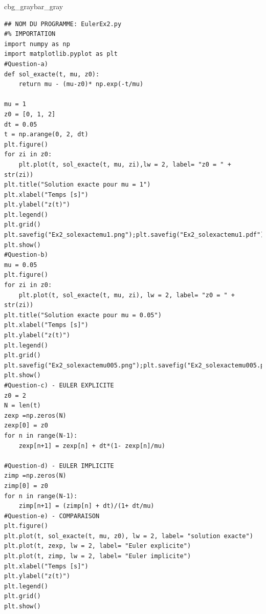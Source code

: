 \documentclass[%
oneside,                 %
final,                   %
10pt,french]{article}
\newenvironment{_pro_tight}[2]{
   \def\FrameCommand{\color{#2}\vrule width 1mm\normalcolor\colorbox{#1}}
   \FrameRule0.6pt\MakeFramed {\advance\hsize-2mm\FrameRestore}\vskip3mm}
   {\vskip0mm\endMakeFramed}
\newenvironment{pro}[2]{
\bgroup\rmfamily
\fboxsep=0mm\relax
\begin{_pro_tight}{#1}{#2}
\list{}{\parsep=-2mm\parskip=0mm\topsep=0pt\leftmargin=2mm
\rightmargin=2\leftmargin\leftmargin=4pt\relax}
\item\relax}
{\endlist\end{_pro_tight}\egroup}
\newenvironment{doconceexercise}{}{}
\begin{document}
\begin{doconceexercise}
\noindent
\begin{pro}{cbg_gray}{bar_gray}\begin{verbatim}
## NOM DU PROGRAMME: EulerEx2.py
#% IMPORTATION
import numpy as np
import matplotlib.pyplot as plt
#Question-a)
def sol_exacte(t, mu, z0):
    return mu - (mu-z0)* np.exp(-t/mu)

mu = 1
z0 = [0, 1, 2]
dt = 0.05
t = np.arange(0, 2, dt)
plt.figure()
for zi in z0:
    plt.plot(t, sol_exacte(t, mu, zi),lw = 2, label= "z0 = " + str(zi))
plt.title("Solution exacte pour mu = 1")
plt.xlabel("Temps [s]")
plt.ylabel("z(t)")
plt.legend()
plt.grid()
plt.savefig("Ex2_solexactemu1.png");plt.savefig("Ex2_solexactemu1.pdf")
plt.show()
#Question-b)
mu = 0.05
plt.figure()
for zi in z0:
    plt.plot(t, sol_exacte(t, mu, zi), lw = 2, label= "z0 = " + str(zi))
plt.title("Solution exacte pour mu = 0.05")
plt.xlabel("Temps [s]")
plt.ylabel("z(t)")
plt.legend()
plt.grid()
plt.savefig("Ex2_solexactemu005.png");plt.savefig("Ex2_solexactemu005.pdf")
plt.show()
#Question-c) - EULER EXPLICITE
z0 = 2
N = len(t)
zexp =np.zeros(N)
zexp[0] = z0
for n in range(N-1):
    zexp[n+1] = zexp[n] + dt*(1- zexp[n]/mu)

#Question-d) - EULER IMPLICITE
zimp =np.zeros(N)
zimp[0] = z0
for n in range(N-1):
    zimp[n+1] = (zimp[n] + dt)/(1+ dt/mu)
#Question-e) - COMPARAISON
plt.figure()
plt.plot(t, sol_exacte(t, mu, z0), lw = 2, label= "solution exacte")
plt.plot(t, zexp, lw = 2, label= "Euler explicite")
plt.plot(t, zimp, lw = 2, label= "Euler implicite")
plt.xlabel("Temps [s]")
plt.ylabel("z(t)")
plt.legend()
plt.grid()
plt.show()
\end{verbatim}
\end{pro}
\noindent


\end{doconceexercise}


\end{document}
